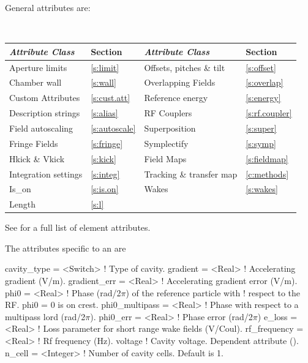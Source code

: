 General  attributes are:
\begin{center}
\tt
\begin{tabular}{llll} \toprule
  {\sl Attribute Class}      & Section           & {\sl Attribute Class}      & Section            \\ \midrule
  Aperture limits            & \ref{s:limit}     & Offsets, pitches \& tilt   & \ref{s:offset}     \\
  Chamber wall               & \ref{s:wall}      & Overlapping Fields         & \ref{s:overlap}    \\
  Custom Attributes          & \ref{s:cust.att}  & Reference energy           & \ref{s:energy}     \\ 
  Description strings        & \ref{s:alias}     & RF Couplers                & \ref{s:rf.coupler} \\
  Field autoscaling          & \ref{s:autoscale} & Superposition              & \ref{s:super}      \\
  Fringe Fields              & \ref{s:fringe}    & Symplectify                & \ref{s:symp}       \\
  Hkick \& Vkick             & \ref{s:kick}      & Field Maps                 & \ref{s:fieldmap}   \\
  Integration settings       & \ref{s:integ}     & Tracking \& transfer map   & \ref{c:methods}    \\
  Is_on                      & \ref{s:is.on}     & Wakes                      & \ref{s:wakes}      \\
  Length                     & \ref{s:l}         &                            &                    \\
  \bottomrule
\end{tabular}
\end{center}
\toffset
See  for a full list of element attributes.

The attributes specific to an  are 
\begin{example}
  cavity_type     = <Switch>  ! Type of cavity.
  gradient        = <Real>    ! Accelerating gradient (V/m).
  gradient_err    = <Real>    ! Accelerating gradient error (V/m).
  phi0            = <Real>    ! Phase (rad/2\(\pi\)) of the reference particle with 
                              !   respect to the RF. phi0 = 0 is on crest.
  phi0_multipass  = <Real>    ! Phase with respect to a multipass lord (rad/2\(\pi\)).
  phi0_err        = <Real>    ! Phase error (rad/2\(\pi\))
  e_loss          = <Real>    ! Loss parameter for short range wake fields (V/Coul).
  rf_frequency    = <Real>    ! Rf frequency (Hz).
  voltage                     ! Cavity voltage. Dependent attribute ().
  n_cell          = <Integer> ! Number of cavity cells. Default is 1.
\end{example}

